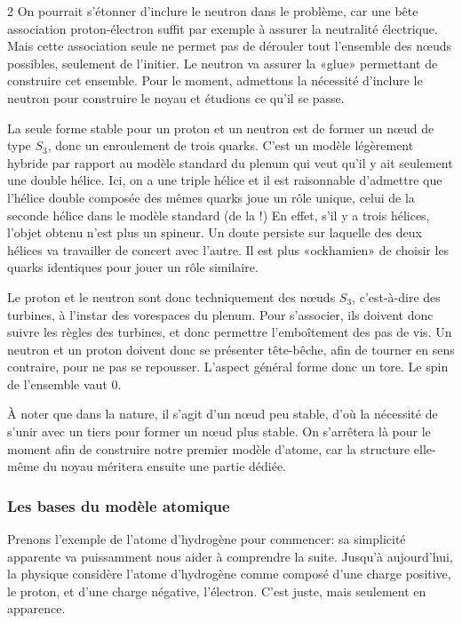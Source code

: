\begin{multicols}{2}
On pourrait s'étonner d'inclure le neutron dans le problème, car une
bête association proton-électron suffit par exemple à assurer la
neutralité électrique. Mais cette association seule ne permet pas de
dérouler tout l'ensemble des nœuds possibles, seulement de l'initier. Le neutron va
assurer la «glue» permettant de construire cet ensemble. Pour le
moment, admettons la nécessité d'inclure le neutron pour construire le
noyau et étudions ce qu'il se passe.

La seule forme stable pour un proton et un neutron est de former un
nœud de type $S_3$, donc un enroulement de trois quarks. C'est un modèle
légèrement hybride par rapport au modèle standard du plenum qui veut qu'il y ait
seulement une double hélice. Ici, on a une triple hélice et il est
raisonnable d'admettre que l'hélice double composée des mêmes quarks
joue un rôle unique, celui de la seconde hélice dans le modèle
standard (de la \PQ!) En effet, s'il y a trois hélices, l'objet obtenu n'est plus un
spineur. Un doute persiste sur laquelle des deux hélices va travailler de
concert avec l'autre. Il est plus «ockhamien» de choisir les quarks
identiques pour jouer un rôle similaire.

Le proton et le neutron sont donc techniquement des nœuds $S_3$,
c'est-à-dire des turbines, à l'instar des vorespaces du plenum. Pour
s'associer, ils doivent donc suivre les règles des turbines, et donc
permettre l'emboîtement des pas de vis. Un neutron et un proton
doivent donc se présenter tête-bêche, afin de tourner en sens
contraire, pour ne pas se repousser. L'aspect général forme donc un
tore. Le spin de l'ensemble vaut 0.

À noter que dans la nature, il s'agit d'un nœud peu stable, d'où la
nécessité de s'unir avec un tiers pour former un nœud plus stable.
On s'arrêtera là pour le moment afin de construire notre premier
modèle d'atome, car la structure elle-même du noyau méritera ensuite
une partie dédiée.

\subsubsection{Les bases du modèle atomique}

Prenons l'exemple de l'atome d'hydrogène pour commencer: sa
simplicité apparente va puissamment nous aider à comprendre la suite.
Jusqu'à aujourd'hui, la physique considère l'atome d'hydrogène comme composé
d'une charge positive, le proton, et d'une charge négative,
l'électron. C'est juste, mais seulement en apparence. 


\end{multicols}
